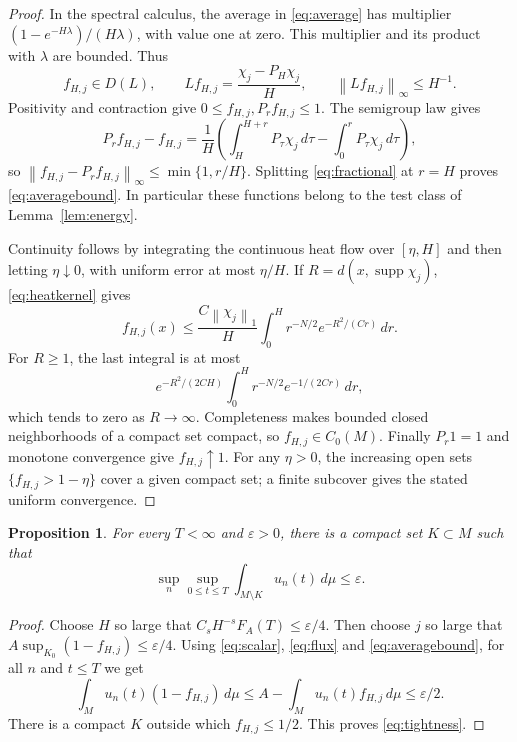 \documentclass[11pt]{article}
\newtheorem{proposition}[theorem]{Proposition}
\theoremstyle{remark}
\newcommand{\dd}{\,d\mu}
\newcommand{\norm}[1]{\left\lVert#1\right\rVert}
\DeclareMathOperator{\supp}{supp}
\begin{document}
\begin{proof}
In the spectral calculus, the average in \eqref{eq:average} has multiplier
$(1-e^{-H\lambda})/(H\lambda)$, with value one at zero. This multiplier
and its product with $\lambda$ are bounded. Thus
\[
 f_{H,j}\in D(L),\qquad
 Lf_{H,j}=\frac{\chi_j-P_H\chi_j}{H},\qquad
 \norm{Lf_{H,j}}_\infty\le H^{-1}.
\]
Positivity and contraction give $0\le f_{H,j},P_rf_{H,j}\le1$.
The semigroup law gives
\[
 P_rf_{H,j}-f_{H,j}
 =\frac1H\left(\int_H^{H+r}P_\tau\chi_j\,d\tau
                     -\int_0^rP_\tau\chi_j\,d\tau\right),
\]
so $\norm{f_{H,j}-P_rf_{H,j}}_\infty\le\min\{1,r/H\}$.
Splitting \eqref{eq:fractional} at $r=H$ proves
\eqref{eq:averagebound}. In particular these functions belong to the
test class of Lemma~\ref{lem:energy}.

Continuity follows by integrating the continuous heat flow over
$[\eta,H]$ and then letting $\eta\downarrow0$, with uniform error at
most $\eta/H$. If $R=d(x,\supp\chi_j)$, \eqref{eq:heatkernel} gives
\[
 f_{H,j}(x)\le \frac{C\norm{\chi_j}_1}{H}
           \int_0^H r^{-N/2}e^{-R^2/(Cr)}\,dr.
\]
For $R\ge1$, the last integral is at most
\[
 e^{-R^2/(2CH)}\int_0^H r^{-N/2}e^{-1/(2Cr)}\,dr,
\]
which tends to zero as $R\to\infty$. Completeness makes bounded closed
neighborhoods of a compact set compact, so $f_{H,j}\in C_0(M)$.
Finally $P_r1=1$ and monotone convergence give $f_{H,j}\uparrow1$.
For any $\eta>0$, the increasing open sets
$\{f_{H,j}>1-\eta\}$ cover a given compact set; a finite subcover gives
the stated uniform convergence.
\end{proof}

\begin{proposition}\label{prop:tightness}
For every $T<\infty$ and $\varepsilon>0$, there is a compact set
$K\subset M$ such that
\begin{equation}\label{eq:tightness}
 \sup_n\sup_{0\le t\le T}\int_{M\setminus K}u_n(t)\dd\le\varepsilon.
\end{equation}
\end{proposition}

\begin{proof}
Choose $H$ so large that $C_sH^{-s}F_A(T)\le\varepsilon/4$.
Then choose $j$ so large that
$A\sup_{K_0}(1-f_{H,j})\le\varepsilon/4$.
Using \eqref{eq:scalar}, \eqref{eq:flux} and
\eqref{eq:averagebound}, for all $n$ and $t\le T$ we get
\[
 \int_Mu_n(t)(1-f_{H,j})\dd
 \le A-\int_Mu_n(t)f_{H,j}\dd\le\varepsilon/2.
\]
There is a compact $K$ outside which $f_{H,j}\le1/2$.
This proves \eqref{eq:tightness}.
\end{proof}
\end{document}
